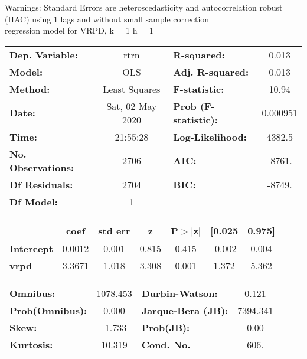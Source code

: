 Warnings: \newline
 [1] Standard Errors are heteroscedasticity and autocorrelation robust (HAC) using 1 lags and without small sample correction\\ 

regression model for VRPD, k = 1 h = 1\begin{center}
\begin{tabular}{lclc}
\toprule
\textbf{Dep. Variable:}    &       rtrn       & \textbf{  R-squared:         } &     0.013   \\
\textbf{Model:}            &       OLS        & \textbf{  Adj. R-squared:    } &     0.013   \\
\textbf{Method:}           &  Least Squares   & \textbf{  F-statistic:       } &     10.94   \\
\textbf{Date:}             & Sat, 02 May 2020 & \textbf{  Prob (F-statistic):} &  0.000951   \\
\textbf{Time:}             &     21:55:28     & \textbf{  Log-Likelihood:    } &    4382.5   \\
\textbf{No. Observations:} &        2706      & \textbf{  AIC:               } &    -8761.   \\
\textbf{Df Residuals:}     &        2704      & \textbf{  BIC:               } &    -8749.   \\
\textbf{Df Model:}         &           1      & \textbf{                     } &             \\
\bottomrule
\end{tabular}
\begin{tabular}{lcccccc}
                   & \textbf{coef} & \textbf{std err} & \textbf{z} & \textbf{P$> |$z$|$} & \textbf{[0.025} & \textbf{0.975]}  \\
\midrule
\textbf{Intercept} &       0.0012  &        0.001     &     0.815  &         0.415        &       -0.002    &        0.004     \\
\textbf{vrpd}      &       3.3671  &        1.018     &     3.308  &         0.001        &        1.372    &        5.362     \\
\bottomrule
\end{tabular}
\begin{tabular}{lclc}
\textbf{Omnibus:}       & 1078.453 & \textbf{  Durbin-Watson:     } &    0.121  \\
\textbf{Prob(Omnibus):} &   0.000  & \textbf{  Jarque-Bera (JB):  } & 7394.341  \\
\textbf{Skew:}          &  -1.733  & \textbf{  Prob(JB):          } &     0.00  \\
\textbf{Kurtosis:}      &  10.319  & \textbf{  Cond. No.          } &     606.  \\
\bottomrule
\end{tabular}
\end{center}


